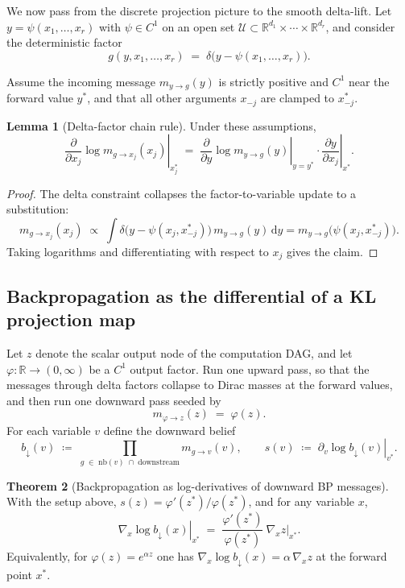 \documentclass[12pt]{article}
\newcommand{\1}{\mathbb{1}}
\renewcommand{\phi}{\varphi}
\newcommand{\defeq}{\coloneq}
\theoremstyle{definition}
\newtheorem{theorem}{Theorem}[section]
\newtheorem{lemma}[theorem]{Lemma}
\begin{document}
We now pass from the discrete projection picture to the smooth delta-lift. Let $y=\psi(x_1,\ldots,x_r)$ with
$\psi\in C^1$ on an open set
$\mathcal U\subset\mathbb{R}^{d_1}\times\cdots\times\mathbb{R}^{d_r}$,
and consider the deterministic factor
\[
g(y,x_1,\ldots,x_r) \;=\; \delta\big(y-\psi(x_1,\ldots,x_r)\big).
\]

Assume the incoming message $m_{y\to g}(y)$ is strictly positive and
$C^1$ near the forward value $y^*$, and that all other arguments
$x_{-j}$ are clamped to $x_{-j}^*$.

\begin{lemma}[Delta-factor chain rule]
\label{lem:delta-chain}
Under these assumptions,
\[
\left.\frac{\partial}{\partial x_j}\log m_{g\to x_j}(x_j)\right|_{x_j^*}
\;=\;
\left.\frac{\partial}{\partial y}\log m_{y\to g}(y)\right|_{y=y^*}\cdot
\left.\frac{\partial y}{\partial x_j}\right|_{x^*}.
\]
\end{lemma}

\begin{proof}
The delta constraint collapses the factor-to-variable update to a substitution:
\[
m_{g\to x_j}(x_j)
\;\propto\;
\int \delta\big(y-\psi(x_j,x_{-j}^*)\big)\, m_{y\to g}(y)\,\mathrm dy
=
m_{y\to g}\!\big(\psi(x_j,x_{-j}^*)\big).
\]
Taking logarithms and differentiating with respect to $x_j$ gives the claim.
\end{proof}

\subsection{Backpropagation as the differential of a KL projection map}
\label{subsec:main-identity}

Let $z$ denote the scalar output node of the computation DAG, and let
$\phi:\mathbb{R}\to(0,\infty)$ be a $C^1$ output factor.
Run one upward pass, so that the messages through delta factors collapse to Dirac
masses at the forward values, and then run one downward pass seeded by
\[
m_{\phi\to z}(z) \;=\; \phi(z).
\]
For each variable $v$ define the downward belief
\[
b_\downarrow(v)
\;\defeq\;
\prod_{g\;\in\;\mathrm{nb}(v)\;\cap \;\text{downstream}} m_{g\to v}(v),
\qquad
s(v)
\;\defeq\;
\left.\partial_v \log b_\downarrow(v)\right|_{v^*}.
\]

\begin{theorem}[Backpropagation as log-derivatives of downward BP messages]
\label{thm:caseA}
With the setup above, $s(z)=\phi'(z^*)/\phi(z^*)$, and for any variable $x$,
\[
\left.\nabla_x \log b_\downarrow(x)\right|_{x^*}
\;=\;
\frac{\phi'(z^*)}{\phi(z^*)}\ \left.\nabla_x z\right|_{x^*}.
\]
Equivalently, for $\phi(z)=e^{\alpha z}$ one has
$\nabla_x \log b_\downarrow(x)=\alpha\,\nabla_x z$ at the forward point $x^*$.
\end{theorem}
\end{document}
